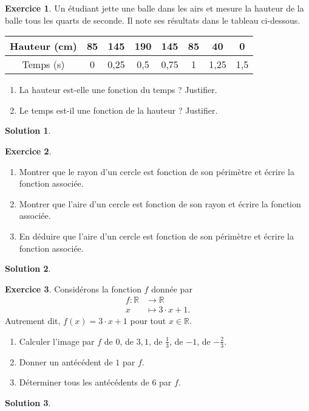 \documentclass[a4paper, 14pt]{extarticle}
\theoremstyle{plain}
\newtheorem*{sol}{Solution}
\theoremstyle{definition}
\newtheorem{ex}{Exercice}
\newcommand{\R}{\mathbb{R}}
\newif\ifsolutions
\newcommand{\exe}[2]{
		\begin{ex} #1  \end{ex}
		\begin{sol} #2 \end{sol}
	}
\newcommand{\exe}[2]{
		\begin{ex} #1  \end{ex}
	}
\begin{document}
\pagestyle{fancy}
\fancyhead[C]{\textbf{Fonctions 1\ifsolutions -- Solutions  \fi}}
\fancyhead[R]{\today}

	\exe{
		Un étudiant jette une balle dans les airs et mesure la hauteur de la balle tous les quarts de seconde.
		Il note ses résultats dans le tableau ci-dessous.
		\begin{center}
			\begin{tabular}{|c|c|c|c|c|c|c|c|}\hline
				Hauteur (cm) & 85 & 145 & 190 & 145 & 85 & 40 & 0 \\ \hline
				Temps (s) & 0 & 0,25 & 0,5 & 0,75 & 1 & 1,25 & 1,5 \\\hline
			\end{tabular}
		\end{center}
		
		\begin{enumerate}
			\item La hauteur est-elle une fonction du temps ? Justifier.
			\item Le temps est-il une fonction de la hauteur ? Justifier.
		\end{enumerate}
	}{}
	
	
	\exe{
		\begin{enumerate}
			\item
			Montrer que le rayon d'un cercle est fonction de son périmètre et écrire la fonction associée.
			\item
			Montrer que l'aire d'un cercle est fonction de son rayon et écrire la fonction associée.
			\item
			En déduire que l'aire d'un cercle est fonction de son périmètre et écrire la fonction associée.
		\end{enumerate}
	}{}
	
	
	\exe{
		Considérons la fonction $f$ donnée par
		\begin{align*}
			f: \R & \longrightarrow \R \\
			x& \longmapsto 3\cdot x+1.
		\end{align*}
		Autrement dit, $f(x) = 3\cdot x + 1$ pour tout $x\in\R$.
		
		\begin{enumerate}
			\item
			Calculer l'image par $f$ de $0$, de $3,1$, de $\frac13$, de $-1$, de $-\frac23$.
			\item
			Donner un antécédent de $1$ par $f$.
			\item
			Déterminer tous les antécédents de $6$ par $f$.	
		\end{enumerate}
	}{}
	
\end{document}
